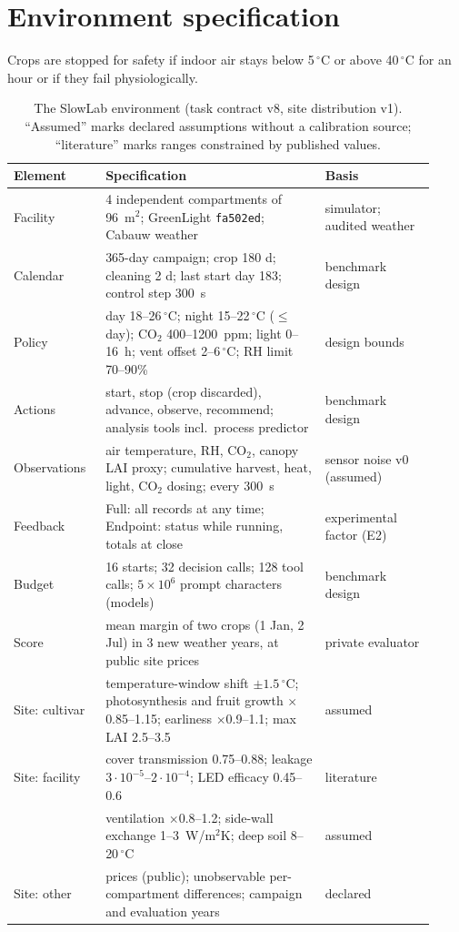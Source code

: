 \section{Environment specification}
\label{app:env}
Crops are stopped for safety if indoor air stays below 5\,$^\circ$C or above 40\,$^\circ$C for an hour or if they fail physiologically.
\begin{table}[h]
\centering\small
\caption{The SlowLab environment (task contract v8, site distribution v1). ``Assumed'' marks declared assumptions without a calibration source; ``literature'' marks ranges constrained by published values.}
\label{tab:task}
\begin{tabular}{@{}p{0.2\linewidth}p{0.48\linewidth}p{0.24\linewidth}@{}}
\toprule
Element & Specification & Basis \\
\midrule
Facility & 4 independent compartments of 96~m$^2$; GreenLight \texttt{fa502ed}; Cabauw weather & simulator; audited weather \\
Calendar & 365-day campaign; crop 180 d; cleaning 2 d; last start day 183; control step 300~s & benchmark design \\
Policy & day 18--26\,$^\circ$C; night 15--22\,$^\circ$C ($\le$ day); CO$_2$ 400--1200~ppm; light 0--16~h; vent offset 2--6\,$^\circ$C; RH limit 70--90\% & design bounds \\
Actions & start, stop (crop discarded), advance, observe, recommend; analysis tools incl.\ process predictor & benchmark design \\
Observations & air temperature, RH, CO$_2$, canopy LAI proxy; cumulative harvest, heat, light, CO$_2$ dosing; every 300~s & sensor noise v0 (assumed) \\
Feedback & Full: all records at any time; Endpoint: status while running, totals at close & experimental factor (E2) \\
Budget & 16 starts; 32 decision calls; 128 tool calls; $5\times10^6$ prompt characters (models) & benchmark design \\
Score & mean margin of two crops (1 Jan, 2 Jul) in 3 new weather years, at public site prices & private evaluator \\
Site: cultivar & temperature-window shift $\pm1.5$\,$^\circ$C; photosynthesis and fruit growth $\times$0.85--1.15; earliness $\times$0.9--1.1; max LAI 2.5--3.5 & assumed \\
Site: facility & cover transmission 0.75--0.88; leakage $3\cdot10^{-5}$--$2\cdot10^{-4}$; LED efficacy 0.45--0.6 & literature \\
 & ventilation $\times$0.8--1.2; side-wall exchange 1--3~W/m$^2$K; deep soil 8--20\,$^\circ$C & assumed \\
Site: other & prices (public); unobservable per-compartment differences; campaign and evaluation years & declared \\
\bottomrule
\end{tabular}
\end{table}

